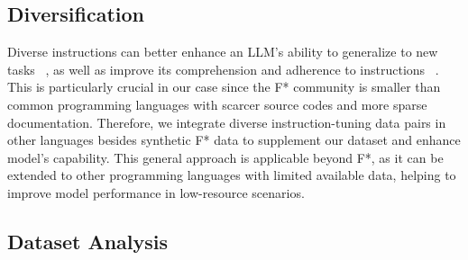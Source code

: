\subsection{Diversification} \label{Diversification}
Diverse instructions can better enhance an LLM’s ability to generalize to new tasks ~\cite{wei2022finetunedlanguagemodelszeroshot}, as well as improve its comprehension and adherence to instructions ~\cite{chen2024diversitysyntheticdataimpact,zhang2024textbfonlyifrevealingdecisiveeffectinstruction,dong2024abilitieslargelanguagemodels}. This is particularly crucial in our case since the F* community is smaller than common programming languages with scarcer source codes and more sparse documentation. Therefore, we integrate diverse instruction-tuning data pairs in other languages besides synthetic F* data to supplement our dataset and enhance model's capability. This general approach is applicable beyond F*, as it can be extended to other programming languages with limited available data, helping to improve model performance in low-resource scenarios.

\subsection{Dataset Analysis}
